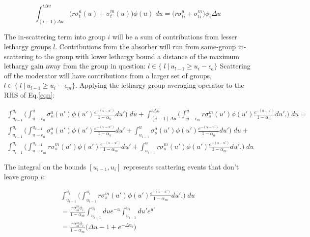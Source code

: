 \documentclass{article}
\begin{document}
          \begin{equation} 
            \int_{(i-1)\Delta u}^{i \Delta u} 
            \big(r \sigma_t^a(u) + \sigma_t^m(u) \big)  \phi(u) \; du = 
            \big( r \sigma_{ti}^a + \sigma_{ti}^m  \big) \phi_i \Delta u
          \end{equation}

          The in-scattering term into group $i$ will be a sum of contributions from lesser lethargy groups $l$.
          Contributions from the absorber will run from same-group in-scattering to the group
          with lower lethargy bound a distance of the maximum lethargy gain away from the group in 
          question: 
          $l \in \{ \; l \: | \: u_{l-1} \geq u_i - \epsilon_a  \} $
          Scattering off the moderator will have contributions from a larger set of groups, 
          $l \in \{ \; l \: | \ u_{l-1} \geq u_i - \epsilon_m  \} $. 
          Applying the lethargy group averaging operator to the RHS of Eq.\:\ref{eqn}:
          

         \begin{align}            
             \int_{u_{i-1}}^{u_{i}} 
            \bigg(  
            \int_{u - \epsilon_a}^{u} \sigma_s^a(u')\phi(u') \frac{e^{-(u-u')}}{1 - \alpha_a}du'  
            \bigg)  \; du + 
            \int_{(i-1)\Delta u}^{i \Delta u} 
            \bigg(  
            \int_{u - \epsilon_m}^{u} r \sigma_s^m(u')\phi(u') \frac{e^{-(u-u')}}{1 - \alpha_m}du'.
        \bigg)  \; du  = \\
             \int_{u_{i-1}}^{u_{i}} 
            \bigg(  
                \int_{u - \epsilon_a}^{u_{i-1}} \sigma_s^a(u')\phi(u') \frac{e^{-(u-u')}}{1 - \alpha_a}du'  +
                \int_{u_{i-1}}^{u} \sigma_s^a(u')\phi(u') \frac{e^{-(u-u')}}{1 - \alpha_a}du'  
            \bigg)  \; du + \\
             \int_{u_{i-1}}^{u_{i}} 
            \bigg(  
                \int_{u - \epsilon_m}^{u_{i-1}} r \sigma_s^m(u')\phi(u') \frac{e^{-(u-u')}}{1 - \alpha_m}du' +
                \int_{u_{i-1}}^{u} r \sigma_s^m(u')\phi(u') \frac{e^{-(u-u')}}{1 - \alpha_m}du'.
            \bigg)  \; du  
         \end{align}
         
         The integral on the bounds $[u_{i-1}, u_i]$ represents scattering events 
         that don't leave group $i$:

         \begin{align}
             \int_{u_{i-1}}^{u_{i}} 
            \bigg(  
                \int_{u_{i-1}}^{u_{i}} r \sigma_s^m(u')\phi(u') \frac{e^{-(u-u')}}{1 - \alpha_m}du'.
            \bigg)  \; du  \\ =   
            \frac{r \sigma_{si}^m \phi_i}{1-\alpha_m} 
            \int_{u_{i-1}}^{u_{i}} du e^{-u} \int_{u_{i-1}}^{u_{i}} du' e^{u'} \\ =
            \frac{r \sigma_{si}^m \phi_i}{1-\alpha_m} \big( \Delta u -1 + e^{-\Delta u_i} \big)
         \end{align}
\end{document}
